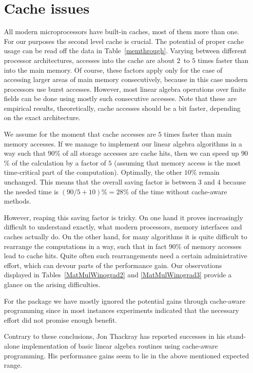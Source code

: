 \section{Cache issues}
\label{sec:cache}
%
\enlargethispage{1\baselineskip}

All modern microprocessors have built-in caches, most of them more than
one. For our purposes the second level cache is crucial. The potential
of proper cache usage can be read off the data in
Table~\ref{memthrough}. Varying between different processor
architectures, accesses into the cache are about $2$~to $5$ times faster
than into the main memory. Of course, these factors apply only for the
case of accessing larger areas of main memory consecutively, because
in this case modern processors use burst accesses. However, most
linear algebra operations over finite fields can be done using mostly 
such consecutive accesses. Note that these are empirical results,
theoretically, cache accesses should be a bit faster, depending on the
exact architecture.

We assume for the moment that cache accesses are $5$ times faster
than main memory accesses. If we manage to implement our linear
algebra algorithms in a way such that $90$\% of all storage accesses
are cache hits, then we can speed up $90$\% of the calculation by a
factor of $5$ (assuming that memory access is the most time-critical
part of the computation). Optimally, the other $10$\% remain unchanged.
This means that the overall saving factor is between $3$ and $4$ because the
needed time is $(90/5+10)\% = 28\%$ of the time without cache-aware
methods. 

However, reaping this saving factor is tricky. On one hand it proves
increasingly difficult to understand exactly, what modern processors,
memory interfaces and caches actually do. On the other hand, for many
algorithms it is quite difficult to rearrange the computations in a
way, such that in fact $90\%$ of memory accesses lead to cache hits.
Quite often such rearrangements need a certain administrative effort,
which can devour parts of the performance gain.
Our observations displayed in Tables~\ref{MatMulWinograd2} and
\ref{MatMulWinograd3} provide a glance on the arising difficulties.

For the {\cvec} package we have mostly ignored the potential gains
through cache-aware programming since in most instances experiments
indicated that the necessary effort did not promise enough benefit.

Contrary to these conclusions, Jon Thackray has reported successes in his
stand-alone implementation of basic linear algebra routines using
cache-aware programming. His performance gains seem to lie in the
above mentioned expected range.
 
